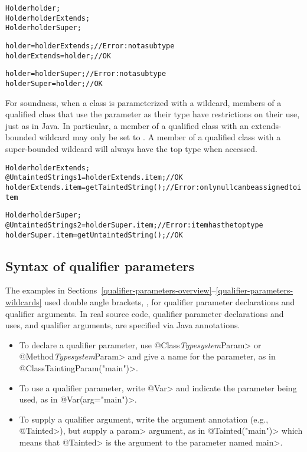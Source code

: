 \begin{alltt}
    Holder holder;
    Holder holderExtends;
    Holder holderSuper;

    holder = holderExtends;    // Error: not a subtype
    holderExtends = holder;    // OK

    holder = holderSuper;    // Error: not a subtype
    holderSuper = holder;    // OK
\end{alltt}

For soundness, when a class is parameterized with a
wildcard, members of a qualified class that use the parameter as their type
have restrictions on their use, just as in Java.
In particular, a member of a qualified class with an extends-bounded wildcard
may only be set to . A member of a qualified class with a
super-bounded wildcard will always have the top type when accessed.

\begin{alltt}
    Holder holderExtends;
    @Untainted String s1 = holderExtends.item;  // OK
    holderExtends.item = getTaintedString();    // Error: only null can be assigned to item

    Holder holderSuper;
    @Untainted String s2 = holderSuper.item;    // Error: item has the top type
    holderSuper.item = getUntaintedString();    // OK
\end{alltt}

\subsection{Syntax of qualifier parameters\label{qualifier-parameters-syntax}}

The examples in
Sections~\ref{qualifier-parameters-overview}--\ref{qualifier-parameters-wildcards}
used double angle brackets, , for qualifier
parameter declarations and qualifier arguments.
In real source code, qualifier parameter declarations and uses, and qualifier
arguments, are specified via Java annotations.

\begin{itemize}
\item
To declare a qualifier parameter, use \<@Class\emph{Typesystem}Param> or
\<@Method\emph{Typesystem}Param> and give a name for the parameter, as in
\<@ClassTaintingParam("main")>.
\item
To use a qualifier parameter, write \<@Var> and indicate the parameter
being used, as in \<@Var(arg="main")>.
\item
To supply a qualifier argument,
write the argument annotation (e.g., \<@Tainted>),
but supply a \<param> argument, as in \<@Tainted("main")> which means that
\<@Tainted> is the argument to the parameter named \<main>.
\end{itemize}

